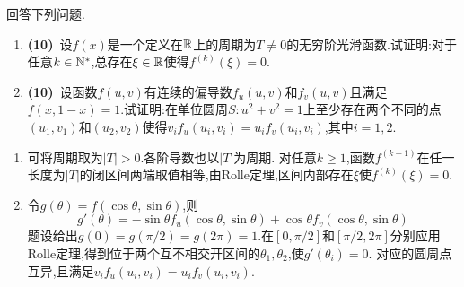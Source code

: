 \documentclass{ctexart}
\begin{document}
\begin{problem}[5.(20\songti{分})]
回答下列问题.
        \begin{enumerate}[label=\tbf{(\arabic*)}]
            \item \textbf{(10)}\ 设$f(x)$是一个定义在$\mathbb{R}$上的周期为$T\neq0$的无穷阶光滑函数.试证明:对于任意$k\in\mathbb{N}^*$,总存在$\xi\in\mathbb{R}$使得$f^{(k)}(\xi)=0$.
            \item \textbf{(10)}\ 设函数$f(u,v)$有连续的偏导数$f_u(u,v)$和$f_v(u,v)$且满足$f(x,1-x)=1$.试证明:在单位圆周$S:u^2+v^2=1$上至少存在两个不同的点$(u_1,v_1)$和$(u_2,v_2)$使得$v_if_u(u_i,v_i)=u_if_v(u_i,v_i)$,其中$i=1,2$.
        \end{enumerate}
\end{problem}
\begin{solution}
\begin{enumerate}[label=\tbf{(\arabic*)},leftmargin=*]
\item 可将周期取为$|T|>0$.各阶导数也以$|T|$为周期.
对任意$k\geqslant1$,函数$f^{(k-1)}$在任一长度为$|T|$的闭区间两端取值相等,由Rolle定理,区间内部存在$\xi$使$f^{(k)}(\xi)=0$.
\item 令$g(\theta)=f(\cos\theta,\sin\theta)$,则
\[g'(\theta)=-\sin\theta f_u(\cos\theta,\sin\theta)+\cos\theta f_v(\cos\theta,\sin\theta)\]
题设给出$g(0)=g(\pi/2)=g(2\pi)=1$.在$[0,\pi/2]$和$[\pi/2,2\pi]$分别应用Rolle定理,得到位于两个互不相交开区间的$\theta_1,\theta_2$,使$g'(\theta_i)=0$.
对应的圆周点互异,且满足$v_if_u(u_i,v_i)=u_if_v(u_i,v_i)$.
\end{enumerate}
\end{solution}
\end{document}
